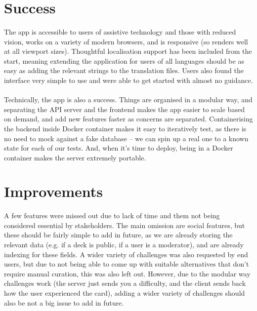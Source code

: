 \documentclass{report}
\begin{document}
\section{Success}
\paragraph{}
The app is accessible to users of assistive technology and those with reduced vision, works on a variety of modern browsers, and is responsive (so renders well at all viewport sizes). Thoughtful localisation support has been included from the start, meaning extending the application for users of all languages should be as easy as adding the relevant strings to the translation files. Users also found the interface very simple to use and were able to get started with almost no guidance.

\paragraph{}
Technically, the app is also a success. Things are organised in a modular way, and separating the API server and the frontend makes the app easier to scale based on demand, and add new features faster as concerns are separated. Containerising the backend inside Docker container makes it easy to iteratively test, as there is no need to mock against a fake database -- we can spin up a real one to a known state for each of our tests. And, when it's time to deploy, being in a Docker container makes the server extremely portable.

\section{Improvements}
\paragraph{}
A few features were missed out due to lack of time and them not being considered essential by stakeholders. The main omission are social features, but these should be fairly simple to add in future, as we are already storing the relevant data (e.g. if a deck is public, if a user is a moderator), and are already indexing for these fields. A wider variety of challenges was also requested by end users, but due to not being able to come up with suitable alternatives that don't require manual curation, this was also left out. However, due to the modular way challenges work (the server just sends you a difficulty, and the client sends back how the user experienced the card), adding a wider variety of challenges should also be not a big issue to add in future.
\end{document}
